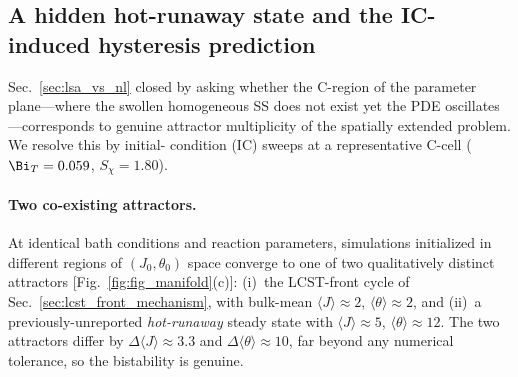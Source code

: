 
\subsection{A hidden hot-runaway state and the IC-induced hysteresis
prediction}
\label{sec:multistability}

Sec.~\ref{sec:lsa_vs_nl} closed by asking whether the C-region of
the parameter plane—where the swollen homogeneous SS does not exist
yet the PDE oscillates—corresponds to genuine attractor multiplicity
of the spatially extended problem.  We resolve this by initial-
condition (IC) sweeps at a representative C-cell
($\Bi_T=0.059$, $S_\chi=1.80$).

\paragraph{Two co-existing attractors.}
At identical bath conditions and reaction parameters, simulations
initialized in different regions of $(J_0, \theta_0)$ space converge
to one of two qualitatively distinct attractors
[Fig.~\ref{fig:fig_manifold}(c)]: (i)~the LCST-front cycle of
Sec.~\ref{sec:lcst_front_mechanism}, with bulk-mean
$\langle J\rangle\!\approx\!2$,
$\langle\theta\rangle\!\approx\!2$, and (ii)~a previously-unreported
\emph{hot-runaway} steady state with
$\langle J\rangle\!\approx\!5$,
$\langle\theta\rangle\!\approx\!12$.
The two attractors differ by
$\Delta\langle J\rangle\!\approx\!3.3$ and
$\Delta\langle\theta\rangle\!\approx\!10$, far beyond any numerical
tolerance, so the bistability is genuine.

